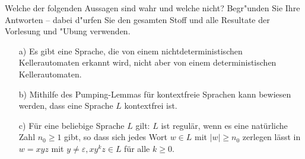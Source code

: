 \begin{exercise}
Welche der folgenden Aussagen sind wahr und welche nicht? Begr"unden Sie Ihre
Antworten -- dabei d"urfen Sie den gesamten Stoff und alle Resultate
der Vorlesung und "Ubung verwenden.
 \begin{enumerate}
    \item[a)] Es gibt eine Sprache, die von einem nichtdeterministischen Kellerautomaten erkannt wird, nicht aber von einem deterministischen Kellerautomaten.
    \item[b)] Mithilfe des Pumping-Lemmas f\"ur kontextfreie Sprachen kann
              bewiesen werden, dass eine Sprache $L$ kontextfrei ist. 
    \item[c)] F\"ur eine beliebige Sprache $L$ gilt: $L$ ist regul\"ar, wenn es eine nat\"urliche Zahl $n_0\ge 1$ gibt, so dass sich jedes Wort $w\in L$ mit $|w|\ge n_0$ zerlegen l\"asst in $w=xyz$ mit $y\not = \varepsilon, xy^kz\in L$ f\"ur alle $k\ge 0$.
 \end{enumerate}
\end{exercise}

